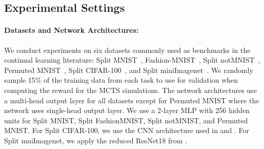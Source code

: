 
\subsection{Experimental Settings}

\paragraph{Datasets and Network Architectures:} We conduct experiments on six datasets commonly used as benchmarks in the continual learning literature: Split MNIST~\citep{lecun1998gradient, zenke2017continual}, Fashion-MNIST~\citep{xiao2017fashion}, Split notMNIST~\citep{bulatov2011notMNIST}, Permuted MNIST~\citep{goodfellow2013empirical}, Split CIFAR-100~\citep{krizhevsky2009learning}, and Split miniImagenet~\citep{vinyals2016matching}. We randomly sample 15\% of the training data from each task to use for validation when computing the reward for the MCTS simulations. The network architectures use a multi-head output layer for all datasets except for Permuted MNIST where the network uses single-head output layer. We use a 2-layer MLP with 256 hidden units for Split MNIST, Split FashionMNIST, Split notMNIST, and Permuted MNIST. For Split CIFAR-100, we use the CNN architecture used in \citet{vinyals2016matching} and \citet{schwarz2018progress}. For Split mniImagenet, we apply the reduced ResNet18 from \citet{lopez2017gradient}. 


